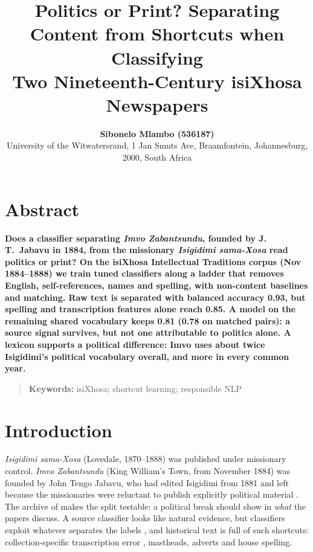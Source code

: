 \documentclass[10pt,letterpaper]{article}
\title{Politics or Print? Separating Content from Shortcuts when Classifying\\
Two Nineteenth-Century isiXhosa Newspapers}
\author{{\large \bf Sibonelo Mlambo (536187)} \\ University of the Witwatersrand, 1 Jan Smuts Ave, Braamfontein, Johannesburg, 2000, South Africa}
\begin{document}
\maketitle

\section{Abstract}
{\bf {}
Does a classifier separating \emph{Imvo Zabantsundu}, founded by J.\,T.\ Jabavu in 1884, from the missionary \emph{Isigidimi sama-Xosa} read politics or print? On the isiXhosa Intellectual Traditions corpus (Nov 1884--1888) we train tuned classifiers along a ladder that removes English, self-references, names and spelling, with non-content baselines and matching. Raw text is separated with balanced accuracy 0.93, but spelling and transcription features alone reach 0.85. A model on the remaining shared vocabulary keeps 0.81 (0.78 on matched pairs): a source signal survives, but not one attributable to politics alone. A lexicon supports a political difference: Imvo uses about twice Isigidimi's political vocabulary overall, and more in every common year.
}
\begin{quote}
\small
\textbf{Keywords:} isiXhosa; shortcut learning; responsible NLP
\end{quote}

\section{Introduction} \label{Intro}
\emph{Isigidimi sama-Xosa} (Lovedale, 1870--1888) was published under missionary control. \emph{Imvo Zabantsundu} (King William's Town, from November 1884) was founded by John Tengo Jabavu, who had edited Isigidimi from 1881 \citep{sahojabavu} and left because the missionaries were reluctant to publish explicitly political material \citep{odendaal1984vukani}. The archive of \citet{schoots2023isixhosa} makes the split testable: a political break should show in \emph{what} the papers discuss. A source classifier looks like natural evidence, but classifiers exploit whatever separates the labels \citep{gururangan2018annotation,geirhos2020shortcut}, and historical text is full of such shortcuts: collection-specific transcription error \citep{hill2019quantifying,vanstrien2020assessing}, mastheads, adverts and house spelling.
\end{document}
